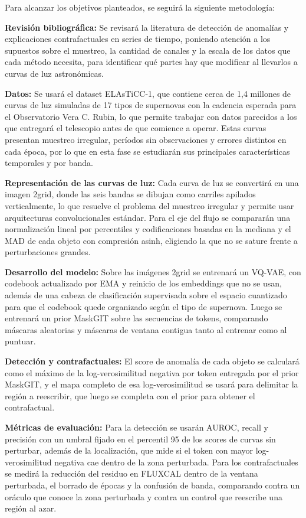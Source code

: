 \documentclass[11pt]{article}
\newcommand{\seccion}[1]{\vspace{6pt}\noindent{\large\textbf{$\bullet$ #1}}\par\vspace{2pt}}
\begin{document}
\seccion{Metodología}

Para alcanzar los objetivos planteados, se seguirá la siguiente metodología:

\textbf{Revisión bibliográfica:} Se revisará la literatura de detección de anomalías y explicaciones contrafactuales en series de tiempo, poniendo atención a los supuestos sobre el muestreo, la cantidad de canales y la escala de los datos que cada método necesita, para identificar qué partes hay que modificar al llevarlos a curvas de luz astronómicas.

\textbf{Datos:} Se usará el dataset ELAsTiCC-1, que contiene cerca de 1,4 millones de curvas de luz simuladas de 17 tipos de supernovas con la cadencia esperada para el Observatorio Vera C. Rubin, lo que permite trabajar con datos parecidos a los que entregará el telescopio antes de que comience a operar. Estas curvas presentan muestreo irregular, períodos sin observaciones y errores distintos en cada época, por lo que en esta fase se estudiarán sus principales características temporales y por banda.

\textbf{Representación de las curvas de luz:} Cada curva de luz se convertirá en una imagen 2grid, donde las seis bandas se dibujan como carriles apilados verticalmente, lo que resuelve el problema del muestreo irregular y permite usar arquitecturas convolucionales estándar. Para el eje del flujo se compararán una normalización lineal por percentiles y codificaciones basadas en la mediana y el MAD de cada objeto con compresión asinh, eligiendo la que no se sature frente a perturbaciones grandes.

\textbf{Desarrollo del modelo:} Sobre las imágenes 2grid se entrenará un VQ-VAE, con codebook actualizado por EMA y reinicio de los embeddings que no se usan, además de una cabeza de clasificación supervisada sobre el espacio cuantizado para que el codebook quede organizado según el tipo de supernova. Luego se entrenará un prior MaskGIT sobre las secuencias de tokens, comparando máscaras aleatorias y máscaras de ventana contigua tanto al entrenar como al puntuar.

\textbf{Detección y contrafactuales:} El score de anomalía de cada objeto se calculará como el máximo de la log-verosimilitud negativa por token entregada por el prior MaskGIT, y el mapa completo de esa log-verosimilitud se usará para delimitar la región a reescribir, que luego se completa con el prior para obtener el contrafactual.

\textbf{Métricas de evaluación:} Para la detección se usarán AUROC, recall y precisión con un umbral fijado en el percentil 95 de los scores de curvas sin perturbar, además de la localización, que mide si el token con mayor log-verosimilitud negativa cae dentro de la zona perturbada. Para los contrafactuales se medirá la reducción del residuo en FLUXCAL dentro de la ventana perturbada, el borrado de épocas y la confusión de banda, comparando contra un oráculo que conoce la zona perturbada y contra un control que reescribe una región al azar.
\end{document}
